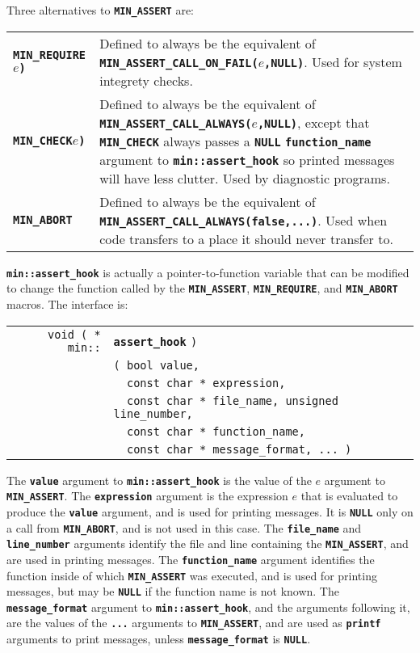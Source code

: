\documentclass[12pt]{article}
\makeatletter
\newcommand{\TT}[1]{{\tt \bfseries #1}}
\newcommand{\ttkey}[1]{\TT{#1}\index{#1@{\tt #1}}}
\newcommand{\ttindex}[1]{\index{#1@{\tt #1}}}
\newcommand{\EOL}{\penalty \exhyphenpenalty}
\newenvironment{indpar}[1][0.3in]%
	{\begin{list}{}%
		     {\setlength{\itemsep}{0in}%
		      \setlength{\topsep}{0in}%
		      \setlength{\parsep}{1ex}%
		      \setlength{\labelwidth}{#1}%
		      \setlength{\leftmargin}{#1}%
		      \addtolength{\leftmargin}{\labelsep}}%
	 \item}%
	{\end{list}}
\newcommand{\LABEL}[1]{\label{#1}}
\newlength{\ARGBREAKLENGTH}
\newcommand{\ARGBREAK}[1][\ARGBREAKLENGTH]{\\&\hspace*{#1}}
\newcommand{\TTKEY}[1]{\ttkey{#1}}
\newcommand{\MINKEY}[1]%
	   {\TT{#1}\ttindex{min::#1}\ttindex{#1}}
\makeatother
\begin{document}
Three alternatives to \TT{MIN\_ASSERT} are:

\begin{indpar}\begin{tabular}{lp{4.5in}}
\TTKEY{MIN\_REQUIRE}\TT{(}$e$\TT{)}
	& Defined to always be the equivalent of
	  \TT{MIN\_\EOL ASSERT\_\EOL CALL\_\EOL ON\_\EOL FAIL(}$e$\TT{,NULL)}.
	  Used for system integrety checks.
\LABEL{MIN_REQUIRE} \\
\TTKEY{MIN\_CHECK}\TT{(}$e$\TT{)}
	& Defined to always be the equivalent of
	  \TT{MIN\_\EOL ASSERT\_\EOL CALL\_\EOL ALWAYS(}$e$\TT{,NULL)},
	  except that \TT{MIN\_\EOL CHECK} always passes a \TT{NULL}
	  \TT{function\_\EOL name} argument to
	  \TT{min::\EOL assert\_\EOL hook} so printed messages will
	  have less clutter.  Used by diagnostic programs.
\LABEL{MIN_CHECK} \\
\TTKEY{MIN\_ABORT}\TT{(...)}
	& Defined to always be the equivalent of
	  \TT{MIN\_\EOL ASSERT\_\EOL CALL\_\EOL ALWAYS(false,...)}.
	  Used when code transfers to a place it
	  should never transfer to.
\LABEL{MIN_ABORT} \\
\end{tabular}\end{indpar}

\TT{min::assert\_hook} is actually a pointer-to-function variable
that can be modified to change the function called by 
the \TT{MIN\_\EOL ASSERT}, \TT{MIN\_\EOL REQUIRE}, and \TT{MIN\_\EOL ABORT}
macros.  The interface is:

\begin{indpar}\begin{tabular}{r@{}l}
\verb|void ( * min::| & \MINKEY{assert\_hook} \verb|)|\ARGBREAK
    \verb|( bool value,|\ARGBREAK
    \verb|  const char * expression,|\ARGBREAK
    \verb|  const char * file_name, unsigned line_number,|\ARGBREAK
    \verb|  const char * function_name,|\ARGBREAK
    \verb|  const char * message_format, ... )|
\LABEL{MIN::ASSERT_HOOK} \\
\end{tabular}\end{indpar}

The \TT{value} argument to \TT{min::\EOL assert\_\EOL hook} is the
value of the $e$ argument to \TT{MIN\_\EOL ASSERT}.
The \TT{expression} argument is the expression $e$ that is evaluated
to produce the \TT{value} argument, and is used for printing messages.
It is \TT{NULL} only on a call from \TT{MIN\_ABORT}, and is not
used in this case.
The \TT{file\_\EOL name} and \TT{line\_\EOL number} arguments
identify the file and line containing the \TT{MIN\_\EOL ASSERT}, and
are used in printing messages.
The \TT{function\_\EOL name} argument identifies the function inside
of which \TT{MIN\_\EOL ASSERT} was executed, and is used for printing
messages, but may be \TT{NULL} if the function name is not known.
The \TT{message\_\EOL format} argument
to \TT{min::\EOL assert\_\EOL hook}, and the arguments following it, are the
values of the \TT{...} arguments to \TT{MIN\_\EOL ASSERT}, and are
used as \TT{printf} arguments to print messages, unless
\TT{message\_\EOL format} is \TT{NULL}.
\end{document}
